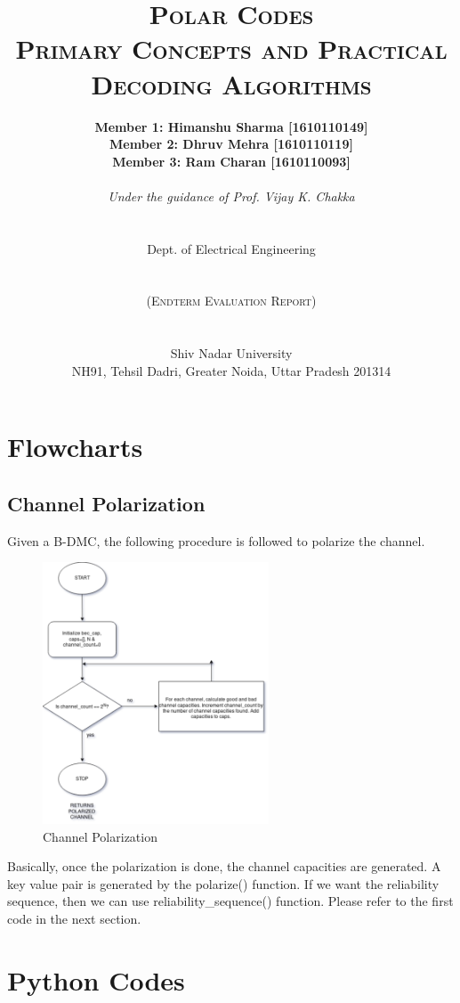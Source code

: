 \documentclass{report}
\title{\textsc{\Huge Polar Codes} \\ \textsc{Primary Concepts and
Practical Decoding Algorithms}}
\author{\textbf{Member 1: Himanshu Sharma [1610110149]} \\ \textbf{Member 2: Dhruv Mehra [1610110119]} \\ \textbf{Member 3: Ram Charan [1610110093]} \\\\ {\it Under the guidance of Prof. Vijay K. Chakka} \\\\\\ \LARGE{Dept. of Electrical Engineering} \\\\\\ \textsc{(Endterm Evaluation Report)} \\\\\\\LARGE{Shiv Nadar University} \\ NH91, Tehsil Dadri, Greater Noida, Uttar Pradesh 201314}
\begin{document}
\maketitle

\section*{Flowcharts}
\subsection*{Channel Polarization}
Given a B-DMC, the following procedure is followed to polarize the channel.
\begin{figure}[H]
\centering
\includegraphics[width=0.6\textwidth, height=0.5\textheight]{code1.png}
\caption{Channel Polarization}
\end{figure}
Basically, once the polarization is done, the channel capacities are generated. A key value pair is generated by the polarize() function. If we want the reliability sequence, then we can use reliability\_sequence() function. Please refer to the first code in the next section.

\section*{Python Codes}
\end{document}
